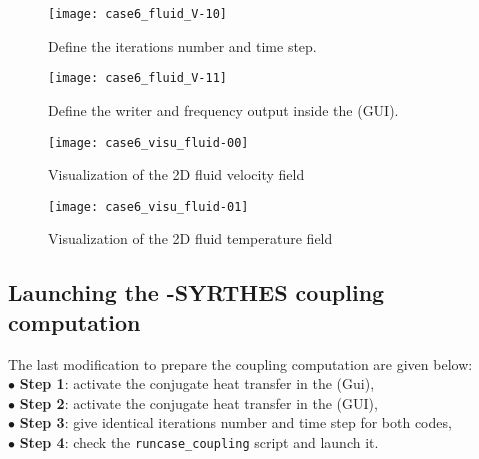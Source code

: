 \newpage

\begin{figure}[h!]
\begin{center}
\texttt{[image: case6\_fluid\_V-10]}
\caption{Define the iterations number and time step.}
\label{fig1_e5}
\end{center}
\end{figure}

\begin{figure}[h!]
\begin{center}
\texttt{[image: case6\_fluid\_V-11]}
\caption{Define the writer and frequency output inside the \CS (GUI).}
\label{fig1_e5}
\end{center}
\end{figure}

\newpage

\begin{figure}[h!]
\begin{center}
\texttt{[image: case6\_visu\_fluid-00]}
\caption{Visualization of the 2D fluid velocity field}
\label{fig1_e5}
\end{center}
\end{figure}

\begin{figure}[h!]
\begin{center}
\texttt{[image: case6\_visu\_fluid-01]}
\caption{Visualization of the 2D fluid temperature field}
\label{fig1_e5}
\end{center}
\end{figure}

\newpage

\subsection{Launching the \CS-SYRTHES coupling computation}

The last modification to prepare the coupling computation are given below:\\
$\bullet$ {\bf Step 1}: activate the conjugate heat transfer in the \syrthes (Gui),       \\
$\bullet$ {\bf Step 2}: activate the conjugate heat transfer in the \CS (GUI),            \\
$\bullet$ {\bf Step 3}: give identical iterations number and time step for both codes,    \\
$\bullet$ {\bf Step 4}: check the \texttt{runcase\_coupling} script and launch it.        \\

